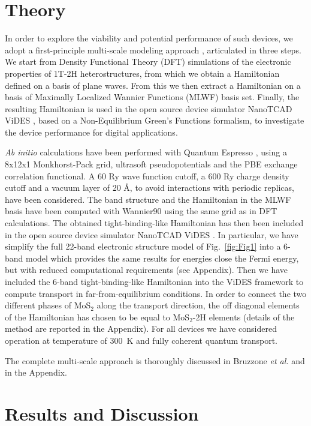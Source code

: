 \documentclass[aps,reprint,superscriptaddress,secnumarabic,amssymb,showpacs]{revtex4-1}
\begin{document}
\section{Theory}

In order to explore the viability and potential performance of such devices, we adopt a first-principle multi-scale modeling approach \cite{Bruzzone2014}, articulated in three steps. We start from Density Functional Theory (DFT) simulations of the electronic properties of 1T-2H heterostructures, from which we obtain a Hamiltonian defined on a basis of plane waves. From this we then extract a Hamiltonian on a basis of Maximally Localized Wannier Functions (MLWF) basis set. Finally, the resulting Hamiltonian is used in the open source device simulator NanoTCAD ViDES \cite{ViDES}, based on a Non-Equilibrium Green's Functions formalism, to investigate the device performance for digital applications. 

{\em Ab initio} calculations have been performed with Quantum Espresso \cite{QE}, using a 8x12x1 Monkhorst-Pack grid, ultrasoft pseudopotentials and the PBE exchange correlation functional. A 60 Ry wave function cutoff, a 600 Ry charge density cutoff and a vacuum layer of 20 \r{A}, to avoid interactions with periodic replicas, have been considered. The band structure and the Hamiltonian in the MLWF basis have been computed with Wannier90 \cite{Wannier} using the same grid as in DFT calculations. The obtained tight-binding-like Hamiltonian has then been included in the open source device simulator NanoTCAD ViDES \cite{ViDES}. In particular, we have simplify the full 22-band electronic structure model of Fig.~\ref{fig:Fig1} into a 6-band model which provides the same results for energies close the Fermi energy, but with reduced computational requirements (see Appendix). Then we have included the 6-band tight-binding-like Hamiltonian into the ViDES framework to compute transport in far-from-equilibrium conditions. In order to connect the two different phases of MoS$_2$ along the transport direction, the off diagonal elements of the Hamiltonian has chosen to be equal to MoS$_2$-2H elements (details of the method are reported in the Appendix). For all devices we have considered operation at temperature of 300~K and fully coherent quantum transport.

The complete multi-scale approach is thoroughly discussed in Bruzzone {\it et al.} \cite{Bruzzone2014} and in the Appendix.



\section{Results and Discussion}
\end{document}
